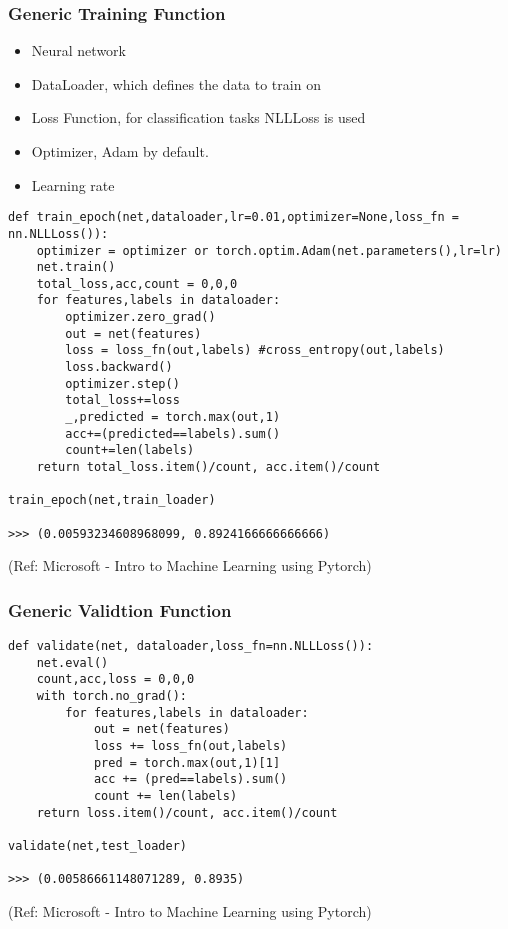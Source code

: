 \begin{frame}[fragile] \frametitle{Generic Training Function}

\begin{itemize}
\item Neural network
\item DataLoader, which defines the data to train on
\item Loss Function, for classification tasks NLLLoss is used
\item Optimizer, Adam by default.
\item Learning rate 
\end{itemize}

\begin{lstlisting}
def train_epoch(net,dataloader,lr=0.01,optimizer=None,loss_fn = nn.NLLLoss()):
    optimizer = optimizer or torch.optim.Adam(net.parameters(),lr=lr)
    net.train()
    total_loss,acc,count = 0,0,0
    for features,labels in dataloader:
        optimizer.zero_grad()
        out = net(features)
        loss = loss_fn(out,labels) #cross_entropy(out,labels)
        loss.backward()
        optimizer.step()
        total_loss+=loss
        _,predicted = torch.max(out,1)
        acc+=(predicted==labels).sum()
        count+=len(labels)
    return total_loss.item()/count, acc.item()/count

train_epoch(net,train_loader)

>>> (0.00593234608968099, 0.8924166666666666)
\end{lstlisting}


\tiny{(Ref: Microsoft - Intro to Machine Learning using Pytorch)}
\end{frame}

\begin{frame}[fragile] \frametitle{Generic Validtion Function}

\begin{lstlisting}
def validate(net, dataloader,loss_fn=nn.NLLLoss()):
    net.eval()
    count,acc,loss = 0,0,0
    with torch.no_grad():
        for features,labels in dataloader:
            out = net(features)
            loss += loss_fn(out,labels) 
            pred = torch.max(out,1)[1]
            acc += (pred==labels).sum()
            count += len(labels)
    return loss.item()/count, acc.item()/count

validate(net,test_loader)

>>> (0.00586661148071289, 0.8935)
\end{lstlisting}


\tiny{(Ref: Microsoft - Intro to Machine Learning using Pytorch)}
\end{frame}

